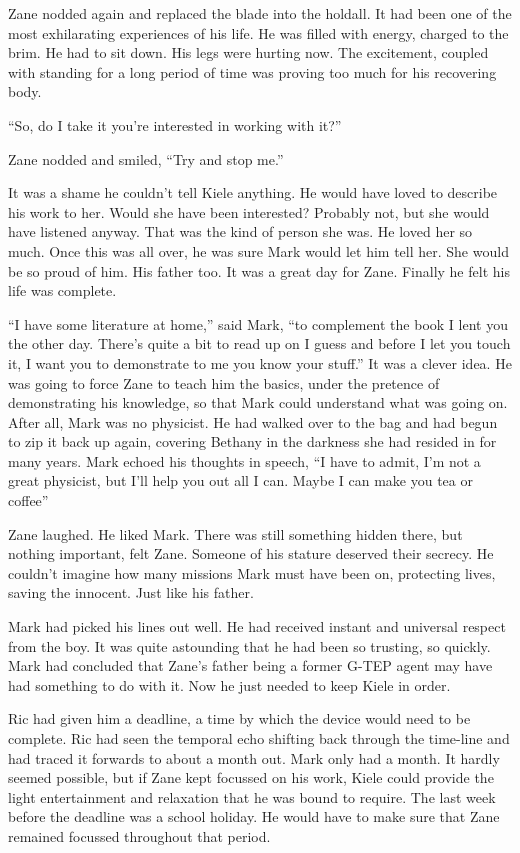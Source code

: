 Zane nodded again and replaced the blade into the holdall.  It had been one of the most exhilarating experiences of his life.  He was filled with energy, charged to the brim.  He had to sit down.  His legs were hurting now.  The excitement, coupled with standing for a long period of time was proving too much for his recovering body.

``So, do I take it you're interested in working with it?''

Zane nodded and smiled, ``Try and stop me.''

It was a shame he couldn't tell Kiele anything.  He would have loved to describe his work to her.  Would she have been interested?  Probably not, but she would have listened anyway.  That was the kind of person she was.  He loved her so much.  Once this was all over, he was sure Mark would let him tell her.  She would be so proud of him.  His father too.  It was a great day for Zane.  Finally he felt his life was complete.

``I have some literature at home,'' said Mark, ``to complement the book I lent you the other day.  There's quite a bit to read up on I guess and before I let you touch it, I want you to demonstrate to me you know your stuff.''  It was a clever idea.  He was going to force Zane to teach him the basics, under the pretence of demonstrating his knowledge, so that Mark could understand what was going on.  After all, Mark was no physicist.  He had walked over to the bag and had begun to zip it back up again, covering Bethany in the darkness she had resided in for many years.  Mark echoed his thoughts in speech, ``I have to admit, I'm not a great physicist, but I'll help you out all I can.  Maybe I can make you tea or coffee''

Zane laughed.  He liked Mark.  There was still something hidden there, but nothing important, felt Zane.  Someone of his stature deserved their secrecy.  He couldn't imagine how many missions Mark must have been on, protecting lives, saving the innocent.  Just like his father.  

Mark had picked his lines out well.  He had received instant and universal respect from the boy.  It was quite astounding that he had been so trusting, so quickly.  Mark had concluded that Zane's father being a former G-TEP agent may have had something to do with it.  Now he just needed to keep Kiele in order.

Ric had given him a deadline, a time by which the device would need to be complete.  Ric had seen the temporal echo shifting back through the time-line and had traced it forwards to about a month out.  Mark only had a month.  It hardly seemed possible, but if Zane kept focussed on his work, Kiele could provide the light entertainment and relaxation that he was bound to require.  The last week before the deadline was a school holiday.  He would have to make sure that Zane remained focussed throughout that period.  

